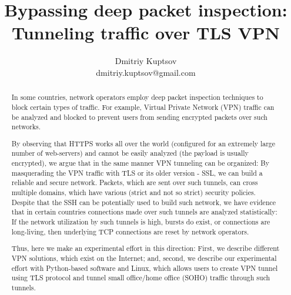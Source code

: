 \documentclass[conference,10pt,letter]{IEEEtran}
\author{Dmitriy Kuptsov\\
dmitriy.kuptsov@gmail.com}
\begin{document}
\sloppy
\title{Bypassing deep packet inspection: Tunneling traffic over TLS VPN}
\maketitle
\begin{abstract}

In some countries, network operators employ deep packet inspection 
techniques to block certain types of traffic. For example, Virtual 
Private Network (VPN) traffic can be analyzed and blocked to prevent 
users from sending encrypted packets over such networks. 

By observing that HTTPS works all over the world (configured for an 
extremely large number of web-servers) and cannot be easily analyzed 
(the payload is usually encrypted), we argue that in the same manner 
VPN tunneling can be organized: By masquerading the VPN traffic with 
TLS or its older version - SSL, we can build a reliable and secure 
network. Packets, which are sent over such tunnels, can cross multiple 
domains, which have various (strict and not so strict) security policies. 
Despite that the SSH can be potentially used to build such network, we have 
evidence that in certain countries connections made over such tunnels are 
analyzed statistically: If the network utilization by such tunnels is high, 
bursts do exist, or connections are long-living, then underlying TCP 
connections are reset by network operators. 

Thus, here we make an experimental effort in this direction: First, we 
describe different VPN solutions, which exist on the Internet; and, 
second, we describe our experimental effort with Python-based software 
and Linux, which allows users to create VPN tunnel using TLS protocol 
and tunnel small office/home office (SOHO) traffic through such tunnels.

\end{abstract}







\end{document}
